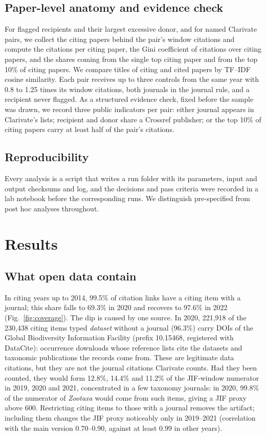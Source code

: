 \documentclass[11pt]{article}
\begin{document}
\subsection{Paper-level anatomy and evidence check}
For flagged recipients and their largest excessive donor, and for named Clarivate pairs, we collect the citing papers
behind the pair's window citations and compute the citations per citing paper, the Gini coefficient of citations
over citing papers, and the shares coming from the single top citing paper and from the top 10\% of citing papers. We
compare titles of citing and cited papers by TF--IDF cosine similarity. Each pair receives up to three controls from
the same year with 0.8 to 1.25 times its window citations, both journals in the journal rule, and a recipient never
flagged. As a structured evidence check, fixed before the sample was drawn, we record three public indicators per
pair: either journal appears in Clarivate's lists; recipient and donor share a Crossref publisher; or the top 10\% of
citing papers carry at least half of the pair's citations.

\subsection{Reproducibility}
Every analysis is a script that writes a run folder with its parameters, input and output checksums and log, and the
decisions and pass criteria were recorded in a lab notebook before the corresponding runs. We distinguish
pre-specified from post hoc analyses throughout.

\section{Results}\label{sec:results}

\subsection{What open data contain}\label{sec:res-coverage}
In citing years up to 2014, 99.5\% of citation links have a citing item with a journal; this share falls to 69.3\%
in 2020 and recovers to 97.6\% in 2022 (Fig.~\ref{fig:coverage}). The dip is caused by one source. In 2020, 221,918 of
the 230,438 citing items typed \emph{dataset} without a journal (96.3\%) carry DOIs of the Global Biodiversity
Information Facility (prefix 10.15468, registered with DataCite): occurrence downloads whose reference lists cite the
datasets and taxonomic publications the records come from. These are legitimate data citations, but they are not the
journal citations Clarivate counts. Had they been counted, they would form 12.8\%, 14.4\% and 11.2\% of the JIF-window
numerator in 2019, 2020 and 2021, concentrated in a few taxonomy journals: in 2020, 99.8\% of the numerator of
\emph{Zootaxa} would come from such items, giving a JIF proxy above 600. Restricting citing items to those with a
journal removes the artifact; including them changes the JIF proxy noticeably only in 2019--2021 (correlation with the
main version 0.70--0.90, against at least 0.99 in other years).
\end{document}
